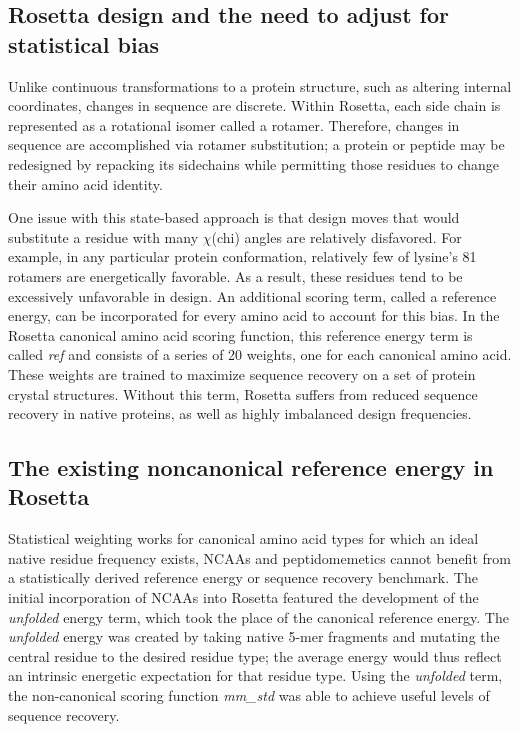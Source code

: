 \subsection{Rosetta design and the need to adjust for statistical bias}
Unlike continuous transformations to a protein structure, such as altering internal coordinates, changes in sequence are discrete.
Within Rosetta, each side chain is represented as a rotational isomer called a rotamer.
Therefore, changes in sequence are accomplished via rotamer substitution; a protein or peptide may be redesigned by repacking its sidechains while permitting those residues to change their amino acid identity\cite{leaver-fay_chapter_2011}.

One issue with this state-based approach is that design moves that would substitute a residue with many $\chi$(chi) angles are relatively disfavored. For example, in any particular protein conformation, relatively few of lysine's 81 rotamers are energetically favorable.
As a result, these residues tend to be excessively unfavorable in design\cite{leaver-fay_chapter_2013,rohl_protein_2004}.
An additional scoring term, called a reference energy, can be incorporated for every amino acid to account for this bias.
In the Rosetta canonical amino acid scoring function, this reference energy term is called \textit{ref} and consists of a series of 20 weights, one for each canonical amino acid.
These weights are trained to maximize sequence recovery on a set of protein crystal structures.
Without this term, Rosetta suffers from reduced sequence recovery in native proteins, as well as highly imbalanced design frequencies\cite{rohl_protein_2004}.

\subsection{The existing noncanonical reference energy in Rosetta}
Statistical weighting works for canonical amino acid types for which an ideal native residue frequency exists, NCAAs and peptidomemetics cannot benefit from a statistically derived reference energy or sequence recovery benchmark.
The initial incorporation of NCAAs into Rosetta featured the development of the \textit{unfolded} energy term, which took the place of the canonical reference energy\cite{renfrew_incorporation_2012}.
The \textit{unfolded} energy was created by taking native 5-mer fragments and mutating the central residue to the desired residue type; the average energy would thus reflect an intrinsic energetic expectation for that residue type.
Using the \textit{unfolded} term, the non-canonical scoring function \textit{mm\_std} was able to achieve useful levels of sequence recovery.

